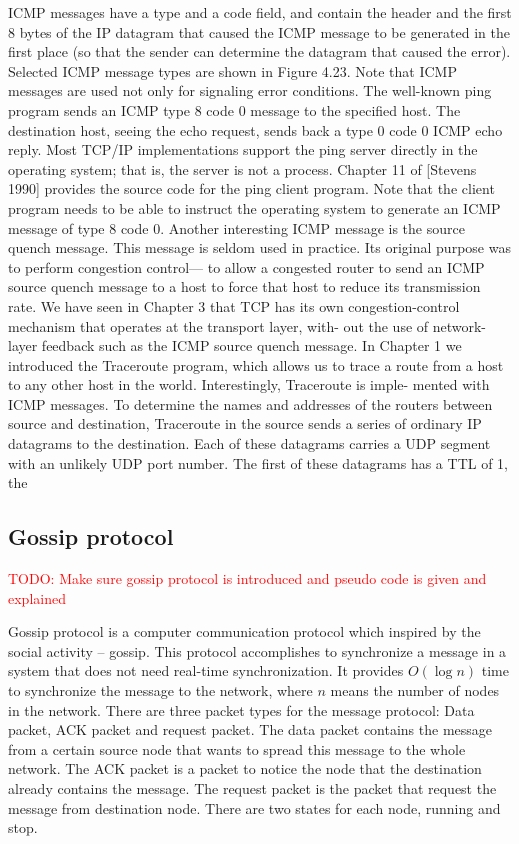 \documentclass[12pt,journal]{IEEEtran}
\begin{document}
 
 ICMP messages have a type and a code field, and contain the header and the first 8 bytes of the IP datagram that caused the ICMP message to be generated in the first place (so that the sender can determine the datagram that caused the error). Selected ICMP message types are shown in Figure 4.23. Note that ICMP messages are used not only for signaling error conditions.
 The well-known ping program sends an ICMP type 8 code 0 message to the specified host. The destination host, seeing the echo request, sends back a type 0 code 0 ICMP echo reply. Most TCP/IP implementations support the ping server directly in the operating system; that is, the server is not a process. Chapter 11 of [Stevens 1990] provides the source code for the ping client program. Note that the client program needs to be able to instruct the operating system to generate an ICMP message of type 8 code 0.
 Another interesting ICMP message is the source quench message. This message is seldom used in practice. Its original purpose was to perform congestion control— to allow a congested router to send an ICMP source quench message to a host to force that host to reduce its transmission rate. We have seen in Chapter 3 that TCP has its own congestion-control mechanism that operates at the transport layer, with- out the use of network-layer feedback such as the ICMP source quench message.
 In Chapter 1 we introduced the Traceroute program, which allows us to trace a route from a host to any other host in the world. Interestingly, Traceroute is imple- mented with ICMP messages. To determine the names and addresses of the routers between source and destination, Traceroute in the source sends a series of ordinary IP datagrams to the destination. Each of these datagrams carries a UDP segment with an unlikely UDP port number. The first of these datagrams has a TTL of 1, the

\subsection{Gossip protocol }
\textcolor{red}{TODO: Make sure gossip protocol is introduced and pseudo code is given and explained}

Gossip protocol is a computer communication protocol which inspired by the social activity -- gossip. This protocol accomplishes to synchronize a message in a system that does not need real-time synchronization. It provides $O(\log n)$ time to synchronize the message to the network, where $n$ means the number of nodes in the network. There are three packet types for the message protocol: Data packet, ACK packet and request packet. The data packet contains the message from a certain source node that wants to spread this message to the whole network. The ACK packet is a packet to notice the node that the destination already contains the message. The request packet is the packet that request the message from destination node. There are two states for each node, running and stop.
\end{document}
